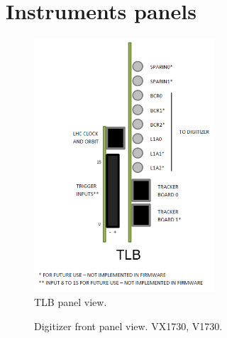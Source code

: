 \chapter{Instruments panels}
\label{Panels}

\begin{figure}[htbp!]
  \centering
    \includegraphics[width=0.6\textwidth]{Appendix2/Pictures/TLBFrontView.png}
    \caption{TLB panel view.}
    \label{fig:TLBFrontView}   
\end{figure}

\newpage
\begin{figure}[htbp!]
   \centering
     
    \caption{Digitizer front panel view. VX1730, V1730.}
    \label{fig:DigitizerPanelDescription}
\end{figure}